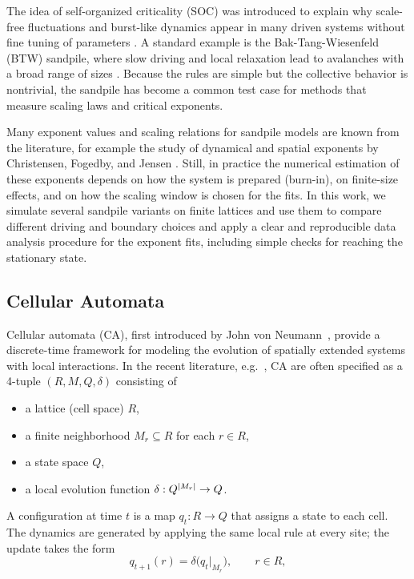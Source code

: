 The idea of self-organized criticality (SOC) was introduced to explain why scale-free fluctuations and burst-like dynamics appear in many driven systems without fine tuning of parameters \cite{bak1987self}. A standard example is the Bak-Tang-Wiesenfeld (BTW) sandpile, where slow driving and local relaxation lead to avalanches with a broad range of sizes \cite{Dhar1990}. Because the rules are simple but the collective behavior is nontrivial, the sandpile has become a common test case for methods that measure scaling laws and critical exponents.

Many exponent values and scaling relations for sandpile models are known from the literature, for example the study of dynamical and spatial exponents by Christensen, Fogedby, and Jensen \cite{christensen1991dynamical}. Still, in practice the numerical estimation of these exponents depends on how the system is prepared (burn-in), on finite-size effects, and on how the scaling window is chosen for the fits. In this work, we simulate several sandpile variants on finite lattices and use them to compare different driving and boundary choices and apply a clear and reproducible data analysis procedure for the exponent fits, including simple checks for reaching the stationary state.

\subsection{Cellular Automata}

Cellular automata (CA), first introduced by John von Neumann~\cite{vonNeumann1966SelfReproducing}, provide a discrete-time framework for modeling the evolution of spatially extended systems with local interactions. In the recent literature, e.g.\ \cite{PerezDelgadoCheung2007}, CA are often specified as a 4-tuple $(R,M,Q,\delta)$ consisting of
\begin{itemize}
    \item a lattice (cell space) $R$,
    \item a finite neighborhood $M_r \subseteq R$ for each $r\in R$,
    \item a state space $Q$,
    \item a local evolution function $\delta : Q^{\abs{M_r}} \to Q$.
\end{itemize}
A configuration at time $t$ is a map $q_t : R \to Q$ that assigns a state to each cell. The dynamics are generated by applying the same local rule at every site; the update takes the form
\begin{equation}
    q_{t+1}(r) = \delta\bigl(q_t|_{M_r}\bigr), \qquad r \in R,
\end{equation}

